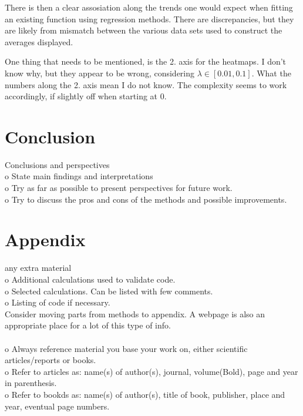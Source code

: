 \documentclass[ 12pt, a4paper ]{article}
\begin{document}
There is then a clear assosiation along the trends one would expect when fitting an existing 
function using regression methods. There are discrepancies, but they are likely from mismatch
between the various data sets used to construct the averages displayed. 

One thing that needs to be mentioned, is the 2. axis for the heatmaps. I don't know why, but they
appear to be wrong, considering $\lambda \in [0.01, 0.1]$. What the numbers along the 2. axis 
mean I do not know. The complexity seems to work accordingly, if slightly off when starting at 0.



\section{Conclusion}
    Conclusions and perspectives\\
    o   State main findings and interpretations \\
    o   Try as far as possible to present perspectives for future work. \\
    o   Try to discuss the pros and cons of the methods and possible improvements. \\
\section{Appendix}
    any extra material \\
    o   Additional calculations used to validate code. \\
    o   Selected calculations. Can be listed with few comments. \\
    o   Listing of code if necessary. \\
    Consider moving parts from methods to appendix. A webpage is also an appropriate place
    for a lot of this type of info. \\\\

    o   Always reference material you base your work on, either scientific articles/reports
        or books. \\
    o   Refer to articles as: name(s) of author(s), journal, volume(Bold), page and year in
        parenthesis. \\
    o   Refer to bookds as: name(s) of author(s), title of book, publisher, place and year, 
        eventual page numbers. \\
\end{document}

